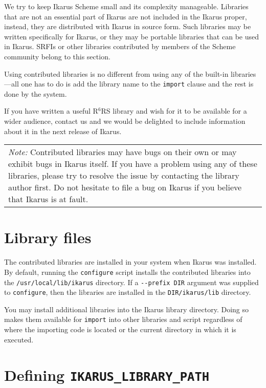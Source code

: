 \documentclass[onecolumn, 12pt, twoside, openright, dvipdfm]{book}
\newcommand{\rnrs}[1]{R$^{\mathrm{#1}}$RS}
\newcommand{\BoxedText}[2]{
  \vspace{.05in}
  \begin{center}
    \begin{tabular}{|p{4.6in}|} {\large \emph{#1}} #2 \end{tabular}
  \end{center}
  \vspace{.05in}
}
\begin{document}
We try to keep Ikarus Scheme small and its complexity manageable.
Libraries that are not an essential part of Ikarus are not included
in the Ikarus proper, instead, they are distributed with Ikarus in
source form.  Such libraries may be written specifically
for Ikarus, or they may be portable libraries that can be used in
Ikarus.   SRFIs or other libraries contributed by members of the
Scheme community belong to this section.

Using contributed libraries is no different from using any of the
built-in libraries---all one has to do is add the library name to
the \texttt{import} clause and the rest is done by the system.

If you have written a useful \rnrs{6} library and wish for it to be
available for a wider audience, contact us and we would be delighted
to include information about it in the next release of Ikarus.

\BoxedText{Note:}{Contributed libraries may have bugs on their own
or may exhibit bugs in Ikarus itself.  If you have a problem using
any of these libraries, please try to resolve the issue by
contacting the library author first.  Do not hesitate to file a bug
on Ikarus if you believe that Ikarus is at fault.}

\newpage
\section*{Library files}

The contributed libraries are installed in your system when Ikarus
was installed.   By default, running the \texttt{configure} script
installs the contributed libraries into the
\verb|/usr/local/lib/ikarus| directory.  If a \verb|--prefix DIR|
argument was supplied to \texttt{configure}, then the libraries are
installed in the \verb|DIR/ikarus/lib| directory.  

You may install additional libraries into the Ikarus library
directory.  Doing so makes them available for \texttt{import} into
other libraries and script regardless of where the importing code is
located or the current directory in which it is executed.  

\section*{Defining \texttt{IKARUS\_LIBRARY\_PATH}}
\end{document}
